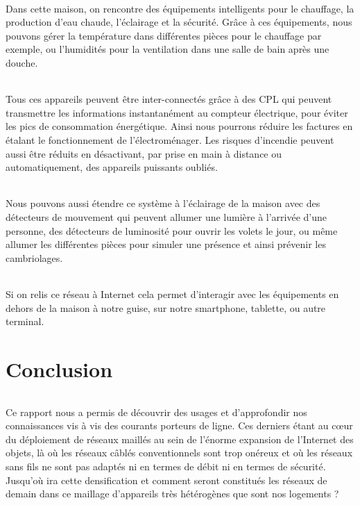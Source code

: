             \paragraph{}
Dans cette maison, on rencontre des équipements intelligents pour le chauffage,
la production d’eau chaude, l’éclairage et la sécurité.
Grâce à ces équipements, nous pouvons gérer la température dans différentes pièces pour le chauffage par exemple,
ou l'humidités pour la ventilation dans une salle de bain après une douche.
            \paragraph{}
Tous ces appareils peuvent être inter-connectés grâce à des CPL qui peuvent transmettre les informations instantanément au compteur électrique,
pour éviter les pics de consommation énergétique.
Ainsi nous pourrons réduire les factures en étalant le fonctionnement de l'électroménager.
Les risques d’incendie peuvent aussi être réduits en désactivant, par prise en main à distance ou automatiquement, des appareils puissants oubliés.
            \paragraph{}
Nous pouvons aussi étendre ce système à l’éclairage de la maison avec des détecteurs de mouvement qui peuvent allumer une lumière à l’arrivée d’une personne,
des détecteurs de luminosité pour ouvrir les volets le jour,
ou même allumer les différentes pièces pour simuler une présence et ainsi prévenir les cambriolages.
            \paragraph{}
Si on relis ce réseau à Internet cela permet d'interagir avec les équipements en dehors de la maison à notre guise,
sur notre smartphone, tablette, ou autre terminal.



\part*{Conclusion}
    \paragraph{}
Ce rapport nous a permis de découvrir des usages et d’approfondir nos connaissances vis à vis des courants porteurs de ligne.
Ces derniers étant au cœur du déploiement de réseaux maillés au sein de l’énorme expansion de l’Internet des objets,
là où les réseaux câblés conventionnels sont trop onéreux et où les réseaux sans fils ne sont pas adaptés ni en termes de débit ni en termes de sécurité.
Jusqu'où ira cette densification et comment seront constitués les réseaux de demain dans ce maillage d'appareils très hétérogènes que sont nos logements ?
    \clearpage{}

